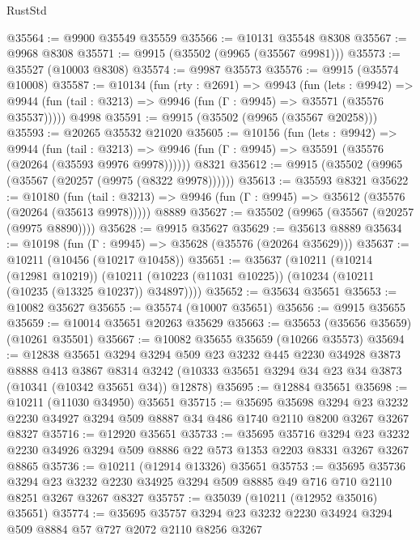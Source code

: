 \begin{lexlean}{RustStd}
\begin{coremodule}
@35564 := @9900 @35549 @35559
@35566 := @10131 @35548 @8308
@35567 := @9968 @8308
@35571 := @9915 (@35502 (@9965 (@35567 @9981)))
@35573 := @35527 (@10003 @8308)
@35574 := @9987 @35573
@35576 := @9915 (@35574 @10008)
@35587 := @10134
    (fun (rty : @2691) =>
    @9943
      (fun (lets : @9942) =>
      @9944 (fun (tail : @3213) => @9946 (fun (Γ : @9945) => @35571 (@35576 @35537)))))
    @4998
@35591 := @9915 (@35502 (@9965 (@35567 @20258)))
@35593 := @20265 @35532 @21020
@35605 := @10156
    (fun (lets : @9942) =>
    @9944
      (fun (tail : @3213) =>
      @9946 (fun (Γ : @9945) => @35591 (@35576 (@20264 (@35593 @9976 @9978))))))
    @8321
@35612 := @9915 (@35502 (@9965 (@35567 (@20257 (@9975 (@8322 @9978))))))
@35613 := @35593 @8321
@35622 := @10180
    (fun (tail : @3213) => @9946 (fun (Γ : @9945) => @35612 (@35576 (@20264 (@35613 @9978)))))
    @8889
@35627 := @35502 (@9965 (@35567 (@20257 (@9975 @8890))))
@35628 := @9915 @35627
@35629 := @35613 @8889
@35634 := @10198 (fun (Γ : @9945) => @35628 (@35576 (@20264 @35629)))
@35637 := @10211 (@10456 (@10217 @10458))
@35651 := @35637
    (@10211
      (@10214 (@12981 @10219))
      (@10211 (@10223 (@11031 @10225)) (@10234 (@10211 (@10235 (@13325 @10237)) @34897))))
@35652 := @35634 @35651
@35653 := @10082 @35627
@35655 := @35574 (@10007 @35651)
@35656 := @9915 @35655
@35659 := @10014 @35651 @20263 @35629
@35663 := @35653 (@35656 @35659) (@10261 @35501)
@35667 := @10082 @35655 @35659 (@10266 @35573)
@35694 := @12838
    @35651
    @3294
    @3294
    @509
    @23
    @3232
    @445
    @2230
    @34928
    @3873
    @8888
    @413
    @3867
    @8314
    @3242
    (@10333 @35651 @3294 @34 @23 @34 @3873 (@10341 (@10342 @35651 @34)) @12878)
@35695 := @12884 @35651
@35698 := @10211 (@11030 @34950) @35651
@35715 := @35695
    @35698
    @3294
    @23
    @3232
    @2230
    @34927
    @3294
    @509
    @8887
    @34
    @486
    @1740
    @2110
    @8200
    @3267
    @3267
    @8327
@35716 := @12920 @35651
@35733 := @35695
    @35716
    @3294
    @23
    @3232
    @2230
    @34926
    @3294
    @509
    @8886
    @22
    @573
    @1353
    @2203
    @8331
    @3267
    @3267
    @8865
@35736 := @10211 (@12914 @13326) @35651
@35753 := @35695
    @35736
    @3294
    @23
    @3232
    @2230
    @34925
    @3294
    @509
    @8885
    @49
    @716
    @710
    @2110
    @8251
    @3267
    @3267
    @8327
@35757 := @35039 (@10211 (@12952 @35016) @35651)
@35774 := @35695
    @35757
    @3294
    @23
    @3232
    @2230
    @34924
    @3294
    @509
    @8884
    @57
    @727
    @2072
    @2110
    @8256
    @3267

\end{coremodule}
\end{lexlean}
